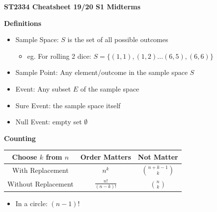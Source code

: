 \documentclass[a4paper, 12pt]{article}
\begin{document}
\setlength\parindent{0pt}
\scriptsize
{}

\begin{center}
{\normalsize\textbf{ST2334 Cheatsheet 19/20 S1 Midterms}}
\end{center}
\begin{multicols*}{3}
\noindent
{\small\textbf{Definitions}}
\begin{itemize}
    \item Sample Space: $S$ is the set of all possible outcomes
    \begin{itemize}
        \item eg. For rolling 2 dice: $S = \{(1,1),(1,2)...(6,5),(6,6)\}$
    \end{itemize}
    \item Sample Point: Any element/outcome in the sample space $S$
    \item Event: Any subset $E$ of the sample space
    \item Sure Event: the sample space itself
    \item Null Event: empty set $\emptyset$
\end{itemize}

\medskip
{\small\textbf{Counting}} \\
\begin{tabular}{ |c|c c| } 
\hline
Choose $k$ from $n$ & Order Matters & Not Matter \\ 
\hline
With Replacement & $n^k$ & $\binom{n + k - 1}{k}$\\ 
Without Replacement & $\frac{n!}{(n - k)!}$ & $\binom{n}{k}$ \\ 
\hline
\end{tabular}
\begin{itemize}
    \item In a circle: $(n - 1)!$ 
\end{itemize}
\medskip


\end{multicols*}
\end{document}
